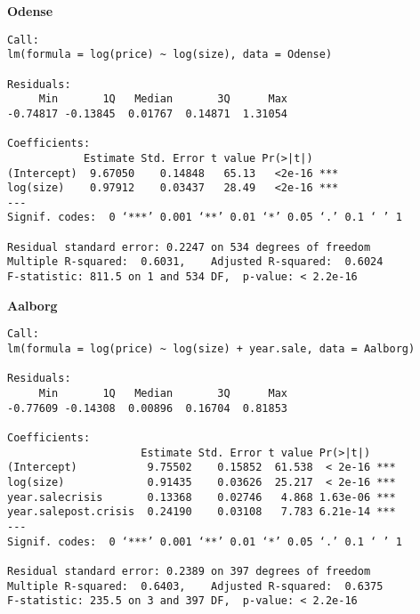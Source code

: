 \textbf{Odense}
\begin{lstlisting}
Call:
lm(formula = log(price) ~ log(size), data = Odense)

Residuals:
     Min       1Q   Median       3Q      Max 
-0.74817 -0.13845  0.01767  0.14871  1.31054 

Coefficients:
            Estimate Std. Error t value Pr(>|t|)    
(Intercept)  9.67050    0.14848   65.13   <2e-16 ***
log(size)    0.97912    0.03437   28.49   <2e-16 ***
---
Signif. codes:  0 ‘***’ 0.001 ‘**’ 0.01 ‘*’ 0.05 ‘.’ 0.1 ‘ ’ 1

Residual standard error: 0.2247 on 534 degrees of freedom
Multiple R-squared:  0.6031,	Adjusted R-squared:  0.6024 
F-statistic: 811.5 on 1 and 534 DF,  p-value: < 2.2e-16
\end{lstlisting}

\textbf{Aalborg}
\begin{lstlisting}
Call:
lm(formula = log(price) ~ log(size) + year.sale, data = Aalborg)

Residuals:
     Min       1Q   Median       3Q      Max 
-0.77609 -0.14308  0.00896  0.16704  0.81853 

Coefficients:
                     Estimate Std. Error t value Pr(>|t|)    
(Intercept)           9.75502    0.15852  61.538  < 2e-16 ***
log(size)             0.91435    0.03626  25.217  < 2e-16 ***
year.salecrisis       0.13368    0.02746   4.868 1.63e-06 ***
year.salepost.crisis  0.24190    0.03108   7.783 6.21e-14 ***
---
Signif. codes:  0 ‘***’ 0.001 ‘**’ 0.01 ‘*’ 0.05 ‘.’ 0.1 ‘ ’ 1

Residual standard error: 0.2389 on 397 degrees of freedom
Multiple R-squared:  0.6403,	Adjusted R-squared:  0.6375 
F-statistic: 235.5 on 3 and 397 DF,  p-value: < 2.2e-16
\end{lstlisting}